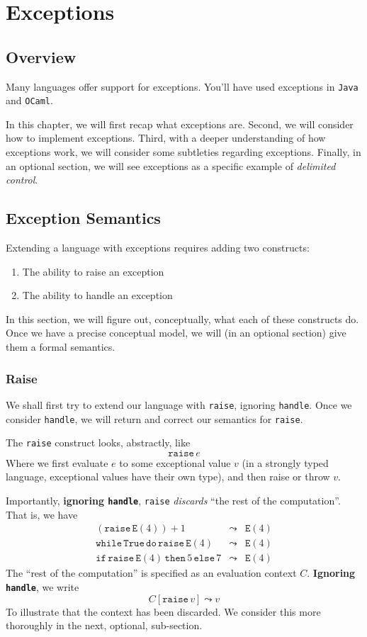 \chapter{Exceptions}

\section{Overview}
Many languages offer support for exceptions. You'll have used exceptions in \texttt{Java} and \texttt{OCaml}.

In this chapter, we will first recap what exceptions are. Second, we will consider how to implement exceptions. Third, with a deeper understanding of how exceptions work, we will consider some subtleties regarding exceptions. Finally, in an optional section, we will see exceptions as a specific example of \textit{delimited control}.

\section{Exception Semantics}
Extending a language with exceptions requires adding two constructs: 
\begin{enumerate}
    \item The ability to raise an exception
    \item The ability to handle an exception
\end{enumerate}

In this section, we will figure out, conceptually, what each of these constructs do. Once we have a precise conceptual model, we will (in an optional section) give them a formal semantics. 

\subsection{Raise}
We shall first try to extend our language with \texttt{raise}, ignoring \texttt{handle}. Once we consider \texttt{handle}, we will return and correct our semantics for \texttt{raise}.

The \texttt{raise} construct looks, abstractly, like
\[\texttt{raise}\, e\]
Where we first evaluate $e$ to some exceptional value $v$ (in a strongly typed language, exceptional values have their own type), and then raise or throw $v$.

Importantly, \textbf{ignoring \texttt{handle}}, \texttt{raise} \textit{discards} ``the rest of the computation''. That is, we have 
\[\begin{array}{rcl}
     (\texttt{raise}\, \texttt{E}(4)) + 1&\leadsto&\texttt{E}(4)  \\
     \texttt{while}\, \texttt{True} \, \texttt{do} \, \texttt{raise} \, \texttt{E}(4) & \leadsto& \texttt{E}(4)\\
     \texttt{if}\, \texttt{raise} \, \texttt{E}(4) \, \texttt{then} \, 5 \, \texttt{else} \, 7 & \leadsto&\texttt{E}(4)
\end{array} \]
The ``rest of the computation'' is specified as an evaluation context $C$. \textbf{Ignoring \texttt{handle}}, we write
\[C[\texttt{raise} \, v] \leadsto v\]
To illustrate that the context has been discarded. We consider this more thoroughly in the next, optional, sub-section.

